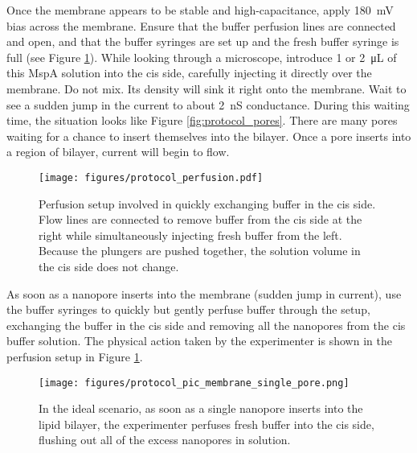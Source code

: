 Once the membrane appears to be stable and high-capacitance, apply \SI{180}{\mV} bias across the membrane.  Ensure that the buffer perfusion lines are connected and open, and that the buffer syringes are set up and the fresh buffer syringe is full (see Figure \ref{fig:protocol_perfusion}).  While looking through a microscope, introduce \num{1} or \SI{2}{\micro\liter} of this MspA solution into the cis side, carefully injecting it directly over the membrane.  Do not mix.  Its density will sink it right onto the membrane.  Wait to see a sudden jump in the current to about \SI{2}{\nano\siemens} conductance.  During this waiting time, the situation looks like Figure \ref{fig:protocol_pores}.  There are many pores waiting for a chance to insert themselves into the bilayer.  Once a pore inserts into a region of bilayer, current will begin to flow.

\begin{figure}[h]
\begin{centering}
\texttt{[image: figures/protocol\_perfusion.pdf]}
\caption[Setup for removing nanopores by buffer perfusion]{Perfusion setup involved in quickly exchanging buffer in the cis side.  Flow lines are connected to remove buffer from the cis side at the right while simultaneously injecting fresh buffer from the left.  Because the plungers are pushed together, the solution volume in the cis side does not change.}
\label{fig:protocol_perfusion}
\end{centering}
\end{figure}

As soon as a nanopore inserts into the membrane (sudden jump in current), use the buffer syringes to quickly but gently perfuse buffer through the setup, exchanging the buffer in the cis side and removing all the nanopores from the cis buffer solution.  The physical action taken by the experimenter is shown in the perfusion setup in Figure \ref{fig:protocol_perfusion}.

\begin{figure}[h]
\begin{centering}
\texttt{[image: figures/protocol\_pic\_membrane\_single\_pore.png]}
\caption[Diagram of single nanopore capture]{In the ideal scenario, as soon as a single nanopore inserts into the lipid bilayer, the experimenter perfuses fresh buffer into the cis side, flushing out all of the excess nanopores in solution.}
\label{fig:protocol_single_pore}
\end{centering}
\end{figure}

